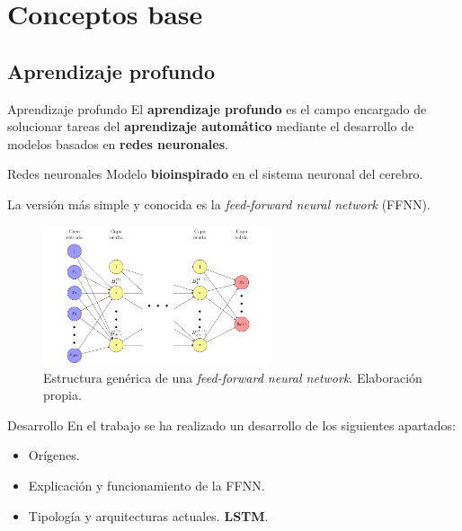 \documentclass[spanish]{beamer}
\begin{document}
\section{Conceptos base}

\subsection{Aprendizaje profundo}

\begin{frame}{Aprendizaje profundo}
  El \textbf{aprendizaje profundo} es el campo encargado de solucionar tareas del \textbf{aprendizaje automático} mediante el desarrollo de modelos basados en \textbf{redes neuronales}.
\end{frame}

\begin{frame}{Redes neuronales}
  Modelo \textbf{bioinspirado} en el sistema neuronal del cerebro.

  \pause

  La versión más simple y conocida es la \emph{feed-forward neural network} (FFNN).

  \begin{figure}
    \centering
    \includegraphics[width=0.6\textwidth]{img/ffnn}
    \caption{Estructura genérica de una \emph{feed-forward neural network}. Elaboración propia.}
  \end{figure}
\end{frame}

\begin{frame}{Desarrollo}
  En el trabajo se ha realizado un desarrollo de los siguientes apartados:
  \begin{itemize}
    \item Orígenes.
    \item Explicación y funcionamiento de la FFNN.
    \item Tipología y arquitecturas actuales. \textbf{LSTM}.
  \end{itemize}

\end{frame}
\end{document}
